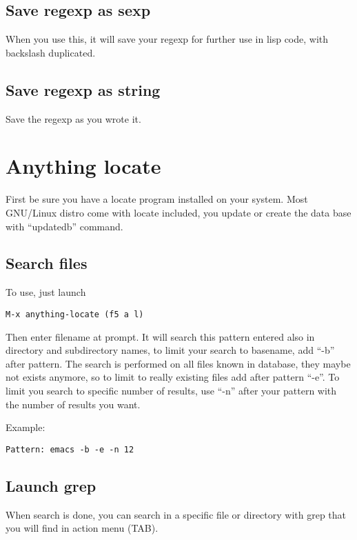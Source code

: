 \documentclass[a4paper,11pt]{article}
\begin{document}
\subsection{Save regexp as sexp}
\label{sec:save-regexp-as}
When you use this, it will save your regexp for further use in lisp code,
with backslash duplicated.

\subsection{Save regexp as string}
\label{sec:save-regexp-as-1}
Save the regexp as you wrote it.

\section{Anything locate}
\label{sec:anything-locate}
First be sure you have a locate program installed on your system.
Most GNU/Linux distro come with locate included, you update or create the data base with
``updatedb'' command.

\subsection{Search files}
\label{sec:search-files}

To use, just launch 
\begin{verbatim}
M-x anything-locate (f5 a l)
\end{verbatim}

Then enter filename at prompt.
It will search this pattern entered also in directory and subdirectory names, to limit your search to basename,
add ``-b'' after pattern.
The search is performed on all files known in database, they maybe not exists anymore, so to limit to
really existing files add after pattern ``-e''.
To limit you search to specific number of results, use ``-n'' after your pattern with the number of results
you want.

Example:
\begin{verbatim}
Pattern: emacs -b -e -n 12
\end{verbatim}

\subsection{Launch grep}
\label{sec:launch-grep}

When search is done, you can search in a specific file or directory with grep that you will find in action menu (TAB).
\end{document}
